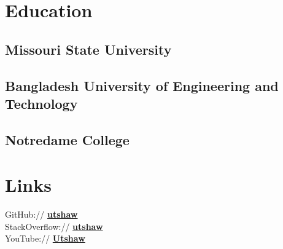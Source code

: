 \documentclass[letterpaper]{deedy-resume} %
\begin{document}
\begin{minipage}[t]{0.33\textwidth} %


\section{Education} 

\subsection{Missouri State University}


\sectionspace %

\subsection{Bangladesh University of Engineering and Technology}

\sectionspace %


\subsection{Notredame College}


\sectionspace %


\section{Links} 

GitHub:// \href{https://github.com/Utshaw}{\bf utshaw} \\
StackOverflow:// \href{https://stackoverflow.com/users/7004995/utshaw}{\bf utshaw} \\
YouTube:// \href{https://www.youtube.com/@Utshaw}{\bf Utshaw} \\


\end{minipage}
\end{document}
